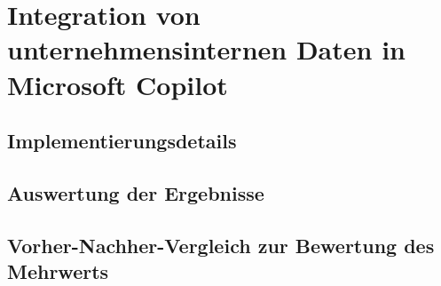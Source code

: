 \chapter{Integration von unternehmensinternen Daten in Microsoft Copilot}

\section{Implementierungsdetails}

\section{Auswertung der Ergebnisse}

\section{Vorher-Nachher-Vergleich zur Bewertung des Mehrwerts}